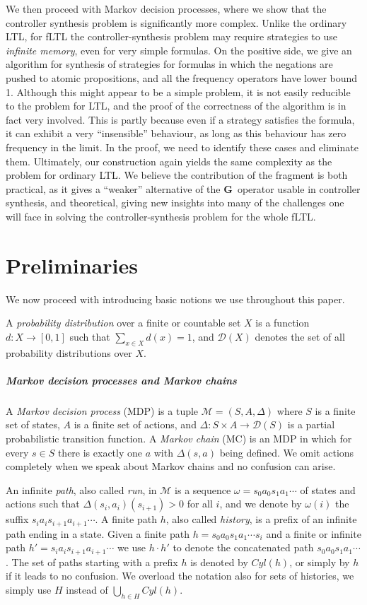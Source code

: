 \documentclass[a4paper,UKenglish]{lipics}
\newcommand{\cyl}{\mathit{Cyl}}
\newcommand{\dist}{\mathcal{D}}
\newcommand{\mdp}{\mathcal{M}}
\newcommand{\states}{S}
\newcommand{\actions}{A}
\newcommand{\tra}{\Delta}
\newcommand{\G}{\mathbf{G}\,}
\begin{document}
We then proceed with Markov decision processes, where we show that the controller synthesis problem is significantly more complex.
Unlike the ordinary LTL, for fLTL the controller-synthesis problem may require strategies to use {\em infinite memory}, even
for very simple formulas. On the positive side, we give an algorithm for synthesis of strategies for formulas in which the
negations are pushed to atomic propositions, and all the frequency operators have lower bound 1. Although this might appear to be
a simple problem, it is not easily reducible to the problem for LTL, and the proof of the correctness of the algorithm is in
fact very involved.
This is partly because even if a strategy satisfies the formula, it can exhibit a very ``insensible'' behaviour,
as long as this behaviour has zero frequency in the limit. In the proof, we need to identify these cases and eliminate them.
Ultimately, our construction again yields the same complexity as the problem for ordinary LTL. We believe the contribution of
the fragment is both practical, as it gives a ``weaker'' alternative of the $\G$ operator usable in controller synthesis, and
theoretical, giving new insights into many of the challenges one will face in solving the controller-synthesis problem for the whole
fLTL.


\section{Preliminaries}
\label{sec:prelims}

We now proceed with introducing basic notions we use throughout this paper.

A {\em probability distribution} over a finite or countable set $X$ is a function $d : X \to [0,1]$ such that
$\sum_{x\in X} d(x) = 1$, and $\dist(X)$ denotes the set of all probability distributions over $X$.

\subparagraph{Markov decision processes and Markov chains}
A {\em Markov decision process} (MDP) is a tuple $\mdp = (\states, \actions, \tra)$ where $\states$ is a finite set of states,
$\actions$ is a finite set of actions, and $\tra:\states\times\actions\rightarrow \dist(S)$
is a partial probabilistic transition function.
A {\em Markov chain} (MC) is an MDP in which for every $s\in \states$ there is exactly one $a$ with
$\tra(s,a)$ being defined. We omit actions completely when we speak
about Markov chains and no confusion can arise.

An infinite {\em path}, also called \emph{run}, in $\mdp$ is a sequence $\omega = s_0a_0s_1a_1\cdots$ of states and actions
such that $\tra(s_i,a_i)(s_{i+1}) > 0$ for all $i$, and we denote by $\omega(i)$ the suffix $s_ia_is_{i+1}a_{i+1}\cdots$.
A finite path $h$, also called \emph{history}, is a prefix of an infinite path
ending in a state. 
Given a finite path $h=s_0a_0s_1a_1\cdots s_i$ and a finite or infinite path $h'=s_ia_is_{i+1}a_{i+1}\cdots$
we use $h\cdot h'$ to denote the concatenated path $s_0a_0s_1a_1\cdots$.
The set of paths starting with a prefix $h$ is denoted by $\cyl(h)$, or simply by $h$ if it leads to no confusion.
We overload the notation also for sets of histories, we simply use $H$ instead of $\bigcup_{h\in H} \cyl(h)$.
\end{document}
